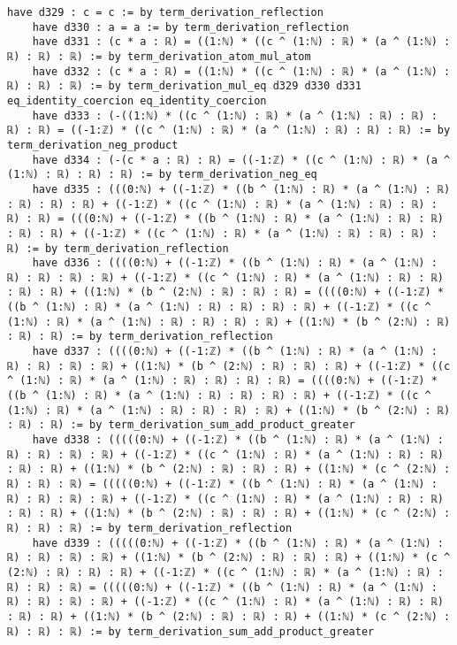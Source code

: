 \documentclass{article}
\begin{document}
\begin{tcolorbox}[colback=white!10, width=\linewidth]
\begin{lstlisting}[language=Lean4]
    have d329 : c = c := by term_derivation_reflection
    have d330 : a = a := by term_derivation_reflection
    have d331 : (c * a : ℝ) = ((1:ℕ) * ((c ^ (1:ℕ) : ℝ) * (a ^ (1:ℕ) : ℝ) : ℝ) : ℝ) := by term_derivation_atom_mul_atom
    have d332 : (c * a : ℝ) = ((1:ℕ) * ((c ^ (1:ℕ) : ℝ) * (a ^ (1:ℕ) : ℝ) : ℝ) : ℝ) := by term_derivation_mul_eq d329 d330 d331 eq_identity_coercion eq_identity_coercion
    have d333 : (-((1:ℕ) * ((c ^ (1:ℕ) : ℝ) * (a ^ (1:ℕ) : ℝ) : ℝ) : ℝ) : ℝ) = ((-1:ℤ) * ((c ^ (1:ℕ) : ℝ) * (a ^ (1:ℕ) : ℝ) : ℝ) : ℝ) := by term_derivation_neg_product
    have d334 : (-(c * a : ℝ) : ℝ) = ((-1:ℤ) * ((c ^ (1:ℕ) : ℝ) * (a ^ (1:ℕ) : ℝ) : ℝ) : ℝ) := by term_derivation_neg_eq
    have d335 : (((0:ℕ) + ((-1:ℤ) * ((b ^ (1:ℕ) : ℝ) * (a ^ (1:ℕ) : ℝ) : ℝ) : ℝ) : ℝ) + ((-1:ℤ) * ((c ^ (1:ℕ) : ℝ) * (a ^ (1:ℕ) : ℝ) : ℝ) : ℝ) : ℝ) = (((0:ℕ) + ((-1:ℤ) * ((b ^ (1:ℕ) : ℝ) * (a ^ (1:ℕ) : ℝ) : ℝ) : ℝ) : ℝ) + ((-1:ℤ) * ((c ^ (1:ℕ) : ℝ) * (a ^ (1:ℕ) : ℝ) : ℝ) : ℝ) : ℝ) := by term_derivation_reflection
    have d336 : ((((0:ℕ) + ((-1:ℤ) * ((b ^ (1:ℕ) : ℝ) * (a ^ (1:ℕ) : ℝ) : ℝ) : ℝ) : ℝ) + ((-1:ℤ) * ((c ^ (1:ℕ) : ℝ) * (a ^ (1:ℕ) : ℝ) : ℝ) : ℝ) : ℝ) + ((1:ℕ) * (b ^ (2:ℕ) : ℝ) : ℝ) : ℝ) = ((((0:ℕ) + ((-1:ℤ) * ((b ^ (1:ℕ) : ℝ) * (a ^ (1:ℕ) : ℝ) : ℝ) : ℝ) : ℝ) + ((-1:ℤ) * ((c ^ (1:ℕ) : ℝ) * (a ^ (1:ℕ) : ℝ) : ℝ) : ℝ) : ℝ) + ((1:ℕ) * (b ^ (2:ℕ) : ℝ) : ℝ) : ℝ) := by term_derivation_reflection
    have d337 : ((((0:ℕ) + ((-1:ℤ) * ((b ^ (1:ℕ) : ℝ) * (a ^ (1:ℕ) : ℝ) : ℝ) : ℝ) : ℝ) + ((1:ℕ) * (b ^ (2:ℕ) : ℝ) : ℝ) : ℝ) + ((-1:ℤ) * ((c ^ (1:ℕ) : ℝ) * (a ^ (1:ℕ) : ℝ) : ℝ) : ℝ) : ℝ) = ((((0:ℕ) + ((-1:ℤ) * ((b ^ (1:ℕ) : ℝ) * (a ^ (1:ℕ) : ℝ) : ℝ) : ℝ) : ℝ) + ((-1:ℤ) * ((c ^ (1:ℕ) : ℝ) * (a ^ (1:ℕ) : ℝ) : ℝ) : ℝ) : ℝ) + ((1:ℕ) * (b ^ (2:ℕ) : ℝ) : ℝ) : ℝ) := by term_derivation_sum_add_product_greater
    have d338 : (((((0:ℕ) + ((-1:ℤ) * ((b ^ (1:ℕ) : ℝ) * (a ^ (1:ℕ) : ℝ) : ℝ) : ℝ) : ℝ) + ((-1:ℤ) * ((c ^ (1:ℕ) : ℝ) * (a ^ (1:ℕ) : ℝ) : ℝ) : ℝ) : ℝ) + ((1:ℕ) * (b ^ (2:ℕ) : ℝ) : ℝ) : ℝ) + ((1:ℕ) * (c ^ (2:ℕ) : ℝ) : ℝ) : ℝ) = (((((0:ℕ) + ((-1:ℤ) * ((b ^ (1:ℕ) : ℝ) * (a ^ (1:ℕ) : ℝ) : ℝ) : ℝ) : ℝ) + ((-1:ℤ) * ((c ^ (1:ℕ) : ℝ) * (a ^ (1:ℕ) : ℝ) : ℝ) : ℝ) : ℝ) + ((1:ℕ) * (b ^ (2:ℕ) : ℝ) : ℝ) : ℝ) + ((1:ℕ) * (c ^ (2:ℕ) : ℝ) : ℝ) : ℝ) := by term_derivation_reflection
    have d339 : (((((0:ℕ) + ((-1:ℤ) * ((b ^ (1:ℕ) : ℝ) * (a ^ (1:ℕ) : ℝ) : ℝ) : ℝ) : ℝ) + ((1:ℕ) * (b ^ (2:ℕ) : ℝ) : ℝ) : ℝ) + ((1:ℕ) * (c ^ (2:ℕ) : ℝ) : ℝ) : ℝ) + ((-1:ℤ) * ((c ^ (1:ℕ) : ℝ) * (a ^ (1:ℕ) : ℝ) : ℝ) : ℝ) : ℝ) = (((((0:ℕ) + ((-1:ℤ) * ((b ^ (1:ℕ) : ℝ) * (a ^ (1:ℕ) : ℝ) : ℝ) : ℝ) : ℝ) + ((-1:ℤ) * ((c ^ (1:ℕ) : ℝ) * (a ^ (1:ℕ) : ℝ) : ℝ) : ℝ) : ℝ) + ((1:ℕ) * (b ^ (2:ℕ) : ℝ) : ℝ) : ℝ) + ((1:ℕ) * (c ^ (2:ℕ) : ℝ) : ℝ) : ℝ) := by term_derivation_sum_add_product_greater

\end{lstlisting}
\end{tcolorbox}
\end{document}
